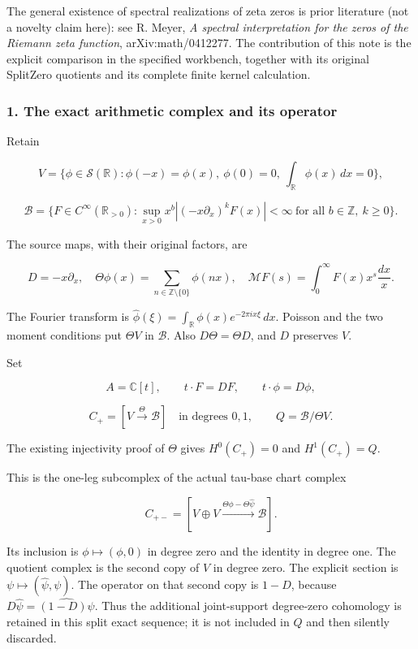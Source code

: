 The general existence of spectral realizations of zeta zeros is prior literature (not a novelty
claim here): see R. Meyer, \emph{A spectral interpretation for the zeros of the Riemann zeta
function}, arXiv:math/0412277. The contribution of this note is the explicit comparison in the
specified workbench, together with its original SplitZero quotients and its complete finite kernel
calculation.

\subsubsection{1. The exact arithmetic complex and its
operator}\label{pr_8:the-exact-arithmetic-complex-and-its-operator}

Retain

\[V=\{\phi\in\mathcal S(\mathbb R):\phi(-x)=\phi(x),\ \phi(0)=0,\ \int_{\mathbb R}\phi(x)\,dx=0\},\]

\[\mathscr B=\{F\in C^\infty(\mathbb R_{>0}):
\sup_{x>0}x^b|(-x\partial_x)^kF(x)|<\infty\ \text{for all }b\in\mathbb Z,\ k\ge0\}.\]

The source maps, with their original factors, are

\[D=-x\partial_x,\quad
\Theta\phi(x)=\sum_{n\in\mathbb Z\setminus\{0\}}\phi(nx),\quad
\mathcal MF(s)=\int_0^\infty F(x)x^s\frac{dx}{x}.\]

The Fourier transform is \(\widehat\phi(\xi)=\int_{\mathbb R}\phi(x)e^{-2\pi i x\xi}\,dx\). Poisson
and the two moment conditions put \(\Theta V\) in \(\mathscr B\). Also \(D\Theta=\Theta D\), and
\(D\) preserves \(V\).

Set

\[A=\mathbb C[t],\qquad t\cdot F=DF,\qquad t\cdot\phi=D\phi,\]

\[C_+=[V\xrightarrow{\Theta}\mathscr B]\quad\text{in degrees }0,1,
\qquad Q=\mathscr B/\Theta V.\]

The existing injectivity proof of \(\Theta\) gives \(H^0(C_+)=0\) and \(H^1(C_+)=Q\).

This is the one-leg subcomplex of the actual tau-base chart complex

\[C_{+-}=[V\oplus V\xrightarrow{\Theta\phi-\Theta\widehat\psi}\mathscr B].\]

Its inclusion is \(\phi\mapsto(\phi,0)\) in degree zero and the identity in degree one. The quotient
complex is the second copy of \(V\) in degree zero. The explicit section is
\(\psi\mapsto(\widehat\psi,\psi)\). The operator on that second copy is \(1-D\), because
\(D\widehat\psi=\widehat{(1-D)\psi}\). Thus the additional joint-support degree-zero cohomology is
retained in this split exact sequence; it is not included in \(Q\) and then silently discarded.

